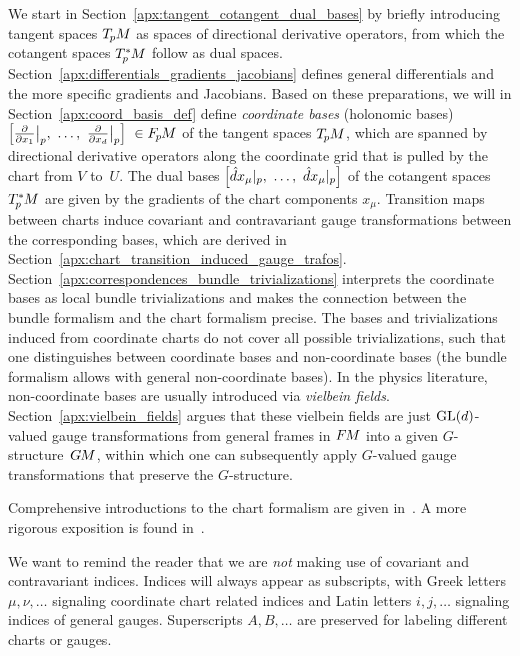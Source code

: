 We start in Section~\ref{apx:tangent_cotangent_dual_bases} by briefly introducing tangent spaces $T_{\mkern-1.5mu p}\mkern-.5muM$ as spaces of directional derivative operators, from which the cotangent spaces $T_{\mkern-1.5mu p}^{\mkern-0mu *}\mkern-1muM$ follow as dual spaces.
Section~\ref{apx:differentials_gradients_jacobians} defines general differentials and the more specific gradients and Jacobians.
Based on these preparations, we will in Section~\ref{apx:coord_basis_def} define \emph{coordinate bases} (holonomic bases)
${\pig[ \frac{\partial}{\partial x_1}\big|_p, \ \dots,\ \frac{\partial}{\partial x_d}\big|_p \pig]\ \in \FpM}$
of the tangent spaces $T_{\mkern-1.5mu p}\mkern-.5muM$, which are spanned by directional derivative operators along the coordinate grid that is pulled by the chart from $V$ to~$U$.
The dual bases
${\pig[ \hat{d}x_\mu|_p, \ \dots,\ \hat{d}x_\mu|_p \pig]}$
of the cotangent spaces $T_{\mkern-1.5mu p}^{\mkern-0mu *}\mkern-1muM$ are given by the gradients of the chart components $x_\mu$.
Transition maps between charts induce covariant and contravariant gauge transformations between the corresponding bases, which are derived in Section~\ref{apx:chart_transition_induced_gauge_trafos}.
Section~\ref{apx:correspondences_bundle_trivializations} interprets the coordinate bases as local bundle trivializations and makes the connection between the bundle formalism and the chart formalism precise.
The bases and trivializations induced from coordinate charts do not cover all possible trivializations, such that one distinguishes between coordinate bases and non-coordinate bases (the bundle formalism allows with general non-coordinate bases).
In the physics literature, non-coordinate bases are usually introduced via \emph{vielbein fields}.
Section~\ref{apx:vielbein_fields} argues that these vielbein fields are just $\operatorname{GL}(d)$-valued gauge transformations from general frames in $F\mkern-1.5muM$ into a given $G$-structure~$G\mkern-1.4muM$, within which one can subsequently apply $G$-valued gauge transformations that preserve the $G$-structure.

Comprehensive introductions to the chart formalism are given in~\cite{nakahara2003geometry,schullerGeometricalAnatomy2016,carroll2004spacetime}.
A more rigorous exposition is found in~\cite{schullerGeometricalAnatomy2016}.

We want to remind the reader that we are \emph{not} making use of covariant and contravariant indices.
Indices will always appear as subscripts, with Greek letters $\mu,\nu,\dots$ signaling coordinate chart related indices and Latin letters $i,j,\dots$ signaling indices of general gauges.
Superscripts $A,B,\dots$ are preserved for labeling different charts or gauges.











